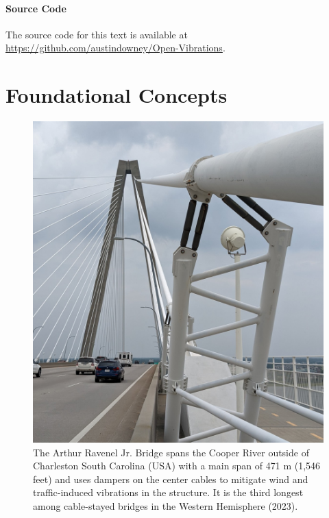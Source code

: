 \documentclass[12pt,letter]{article}
\begin{document}
\subsection{Source Code}
The source code for this text is available at \url{https://github.com/austindowney/Open-Vibrations}.







\pagebreak

\setcounter{secnumdepth}{3} %
\setcounter{page}{1}


\part{Foundational Concepts}

\begin{figure}[H]
	\centering
	\includegraphics[width=6.5in]{figures/Arthur_Ravenel_Jr_Bridge_dampers} \\
	The Arthur Ravenel Jr. Bridge spans the Cooper River outside of Charleston South Carolina (USA) with a main span of 471 m (1,546 feet) and uses dampers on the center cables to mitigate wind and traffic-induced vibrations in the structure. It is the third longest among cable-stayed bridges in the Western Hemisphere (2023).
\end{figure}
\end{document}
